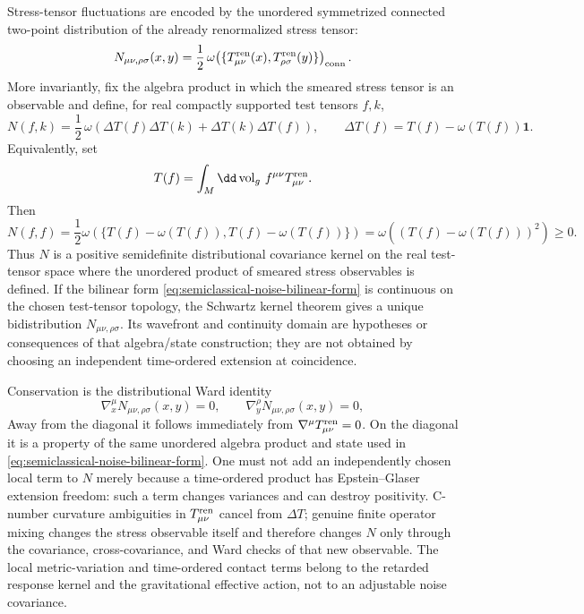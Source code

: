Stress-tensor fluctuations are encoded by the unordered symmetrized connected
two-point distribution of the already renormalized stress tensor:
\begin{equation}
  N_{\mu\nu,\rho\sigma}(x,y)
  =
  \frac12\,
  \omega\!\left(
    \{T_{\mu\nu}^{\rm ren}(x),T_{\rho\sigma}^{\rm ren}(y)\}
  \right)_{\rm conn}.
  \label{eq:semiclassical-noise-kernel}
\end{equation}
More invariantly, fix the algebra product in which the smeared stress tensor
is an observable and define, for real compactly supported test tensors
\(f,k\),
\begin{equation}
  N(f,k)
  =
  \frac12\,\omega\!\left(
    \Delta T(f)\Delta T(k)+\Delta T(k)\Delta T(f)
  \right),
  \qquad
  \Delta T(f)=T(f)-\omega(T(f))\mathbf 1 .
  \label{eq:semiclassical-noise-bilinear-form}
\end{equation}
Equivalently, set
\[
  T(f)=\int_M\dd\operatorname{vol}_g\,f^{\mu\nu}T_{\mu\nu}^{\rm ren}.
\]
Then
\begin{equation}
  N(f,f)
  =
  \frac12\omega(\{T(f)-\omega(T(f)),T(f)-\omega(T(f))\})
  =
  \omega\!\left((T(f)-\omega(T(f)))^2\right)
  \ge0 .
  \label{eq:semiclassical-noise-positivity}
\end{equation}
Thus \(N\) is a positive semidefinite distributional covariance kernel on
the real test-tensor space where the unordered product of smeared stress
observables is defined.  If the bilinear form
\eqref{eq:semiclassical-noise-bilinear-form} is continuous on the chosen
test-tensor topology, the Schwartz kernel theorem gives a unique
bidistribution \(N_{\mu\nu,\rho\sigma}\).  Its wavefront and continuity domain
are hypotheses or consequences of that algebra/state construction; they are
not obtained by choosing an independent time-ordered extension at
coincidence.

Conservation is the distributional Ward identity
\begin{equation}
  \nabla_x^\mu N_{\mu\nu,\rho\sigma}(x,y)=0,
  \qquad
  \nabla_y^\rho N_{\mu\nu,\rho\sigma}(x,y)=0,
  \label{eq:semiclassical-noise-conservation}
\end{equation}
Away from the diagonal it follows immediately from
\(\nabla^\mu T_{\mu\nu}^{\rm ren}=0\).  On the diagonal it is a property of
the same unordered algebra product and state used in
\eqref{eq:semiclassical-noise-bilinear-form}.  One must not add an
independently chosen local term to \(N\) merely because a time-ordered product
has Epstein--Glaser extension freedom: such a term changes variances and can
destroy positivity.  C-number curvature ambiguities in
\(T_{\mu\nu}^{\rm ren}\) cancel from \(\Delta T\); genuine finite operator
mixing changes the stress observable itself and therefore changes \(N\) only
through the covariance, cross-covariance, and Ward checks of that new
observable.  The local metric-variation and time-ordered contact terms belong
to the retarded response kernel and the gravitational effective action, not to
an adjustable noise covariance.

